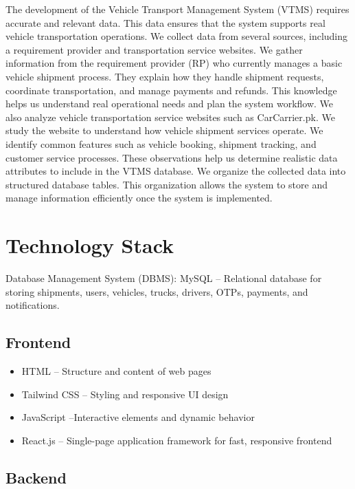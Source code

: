 \documentclass[12pt,a4paper]{article}
\begin{document}
The development of the Vehicle Transport Management System (VTMS) requires accurate and relevant data. This data ensures that the system supports real vehicle transportation operations. We collect data from several sources, including a requirement provider and transportation service websites.
We gather information from the requirement provider (RP) who currently manages a basic vehicle shipment process. They explain how they handle shipment requests, coordinate transportation, and manage payments and refunds. This knowledge helps us understand real operational needs and plan the system workflow.
We also analyze vehicle transportation service websites such as CarCarrier.pk. We study the website to understand how vehicle shipment services operate. We identify common features such as vehicle booking, shipment tracking, and customer service processes. These observations help us determine realistic data attributes to include in the VTMS database.
We organize the collected data into structured database tables. This organization allows the system to store and manage information efficiently once the system is implemented.




\section{Technology Stack}
Database Management System (DBMS): MySQL – Relational database for storing shipments, users, vehicles, trucks, drivers, OTPs, payments, and notifications.

\subsection{Frontend}

\begin{itemize}
\item HTML – Structure and content of web pages
\item Tailwind CSS – Styling and responsive UI design
\item JavaScript –Interactive elements and dynamic behavior
\item React.js – Single-page application framework for fast, responsive frontend
\end{itemize}

\subsection{Backend}
\end{document}
